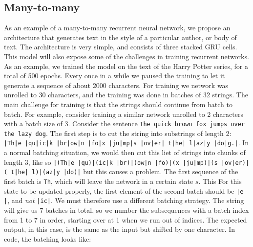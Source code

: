 \documentclass[10pt]{amsart}
\theoremstyle{definition}
\begin{document}
\subsection{Many-to-many}

As an example of a many-to-many recurrent neural network, we propose an architecture that generates text in the style of a particular author, or body of text.  The architecture is very simple, and consists of three stacked GRU cells.  This model will also expose some of the challenges in training recurrent networks.  As an example, we trained the model on the text of the Harry Potter series, for a total of 500 epochs.  Every once in a while we paused the training to let it generate a sequence of about 2000 characters.  For training we network was unrolled to 30 characters, and the training was done in batches of 32 strings.  The main challenge for training is that the strings should continue from batch to batch.  For example, consider training a similar network unrolled to 2 characters with a batch size of 3.  Consider the sentence {\tt The quick brown fox jumps over the lazy dog}.  The first step is to cut the string into substrings of length 2:
{\tt |Th|e |qu|ic|k |br|ow|n |fo|x |ju|mp|s |ov|er| t|he| l|az|y |do|g.|}. In a normal batching situation, we would then cut this liet of strings into chunks of length 3, like so
{\tt |(Th|e |qu)|(ic|k |br)|(ow|n |fo)|(x |ju|mp)|(s |ov|er)|( t|he| l)|(az|y |do)|} but this causes a problem.  The first sequence of the first batch is {\tt Th}, which will leave the network in a certain state $s$. This For this state to be updated properly, the first element of the second batch should be {\tt |e |}, and {\em not} {\tt |ic|}.  We must therefore use a different batching strategy. The string will give us 7 batches in total, so we number the subsequences with a batch index from 1 to 7 in order, starting over at 1 when we run out of indices. The expected output, in this case, is the same as the input but shifted by one character. In code, the batching looks like:
\end{document}
